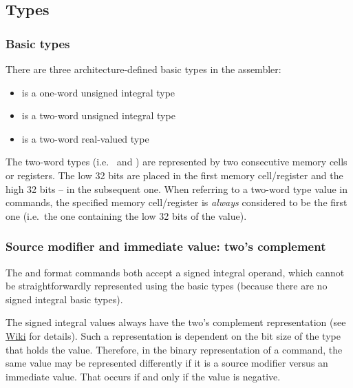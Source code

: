 \subsection{Types}

\hypertarget{types:basic} {
    \subsubsection{Basic types}
}

\vspace{-0.2cm}
There are three architecture-defined basic types in the  assembler:

\begin{itemize}
    \item {} is a one-word unsigned integral type
    \item {} is a two-word unsigned integral type
    \item {} is a two-word real-valued type
\end{itemize}

\hypertarget{types:two_words_storage}{}
The two-word types (i.e.\  and ) are represented by two
consecutive memory cells or registers.
The low 32 bits are placed in the first memory cell/register and the high
32 bits -- in the subsequent one.
When referring to a two-word type value in commands, the specified
memory cell/register is \textit{always} considered to be the first one
(i.e.\ the one containing the low 32 bits of the value).

\newpage

\hypertarget{types:twos_complement}{
    \subsubsection{Source modifier and immediate value: two's complement}
}

The  and  format commands both accept a signed integral operand, which
cannot be straightforwardly represented using the basic types (because there
are no signed integral basic types).

The signed integral values always have the two's complement representation
(see \href{https://en.wikipedia.org/wiki/Two\%27s_complement}{Wiki} for details).
Such a representation is dependent on the bit size of the type that holds the
value.
Therefore, in the binary representation of a command, the same value may
be represented differently if it is a source modifier versus an immediate value.
That occurs if and only if the value is negative.

